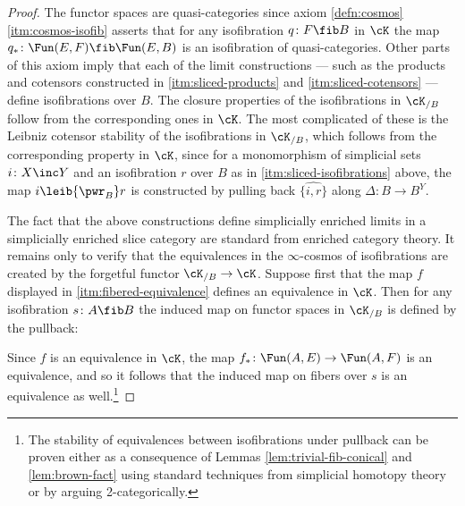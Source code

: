 \begin{proof}
The functor spaces are quasi-categories since axiom \ref{defn:cosmos}\ref{itm:cosmos-isofib} asserts that for any isofibration $q \colon F \fib B$ in $\cK$ the map $q_* \colon \Fun(E,F) \fib \Fun(E,B)$ is an isofibration of quasi-categories. Other parts of this axiom imply that each of the limit constructions --- such as the products and cotensors constructed in \ref{itm:sliced-products} and \ref{itm:sliced-cotensors} --- define isofibrations over $B$. The closure properties of the isofibrations in $\cK_{/B}$ follow from the corresponding ones in $\cK$. The most complicated of these is the Leibniz cotensor stability of the isofibrations in $\cK_{/B}$, which follows from the corresponding property in $\cK$, since for a monomorphism of simplicial sets $i \colon X\inc Y$ and an isofibration $r$ over $B$ as in \ref{itm:sliced-isofibrations} above, the map $i \leib{\pwr_B} r$ is constructed by pulling back $\widehat{\{i , r\}}$ along $\Delta \colon B \to B^Y$.

The fact that the above constructions define simplicially enriched limits in a simplicially enriched slice category are standard from enriched category theory. It remains only to verify that the equivalences in the $\infty$-cosmos of isofibrations are created by the forgetful functor $\cK_{/B} \to \cK$. Suppose first that the map $f$ displayed in \ref{itm:fibered-equivalence} defines an equivalence in $\cK$. Then for any isofibration $s \colon A \fib B$ the induced map on functor spaces in $\cK_{/B}$ is defined by the pullback:
\begin{center}
\end{center}
Since $f$ is an equivalence in $\cK$, the map $f_* \colon \Fun(A,E) \to \Fun(A,F)$ is an equivalence, and so it follows that the induced map on fibers over $s$ is an equivalence as well.\footnote{The stability of equivalences between isofibrations under pullback can be proven either as a consequence of Lemmas \ref{lem:trivial-fib-conical} and \ref{lem:brown-fact} using standard techniques from simplicial homotopy theory %
 or by arguing 2-categorically.} %


\end{proof}
